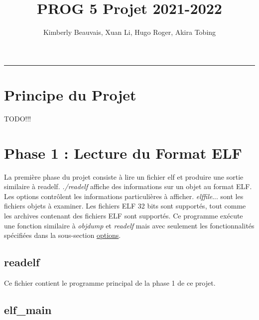 \documentclass[a4paper]{article} %
\title{PROG 5 Projet 2021-2022}
\author{Kimberly Beauvais, Xuan Li, Hugo Roger, Akira Tobing}
\begin{document}
\maketitle
\begin{center}
\rule{\textwidth}{1pt}
\end{center}


\renewcommand{\contentsname}{Table des Matières}
\tableofcontents

\section*{Principe du Projet}

TODO!!!


\section{Phase 1 : Lecture du Format ELF }
\label{sec:phase1}
\noindent La première phase du projet consiste à lire un fichier elf et produire une sortie similaire à readelf. \textit{./readelf} affiche des informations sur un objet au format ELF.  Les options contrôlent les informations particulières à afficher. \textit{elffile}... sont les fichiers objets à examiner.  Les fichiers ELF 32 bits sont supportés, tout comme les archives contenant des fichiers ELF sont supportés. Ce programme exécute une fonction similaire à \textit{objdump} et \textit{readelf} mais avec seulement les fonctionnalités spécifiées dans la sous-section \hyperref[sec:options]{options}. 



\subsection{readelf}
\label{sec:readelf}
Ce fichier contient le programme principal de la phase 1 de ce projet. 


\subsection{elf\_main}
\end{document}
